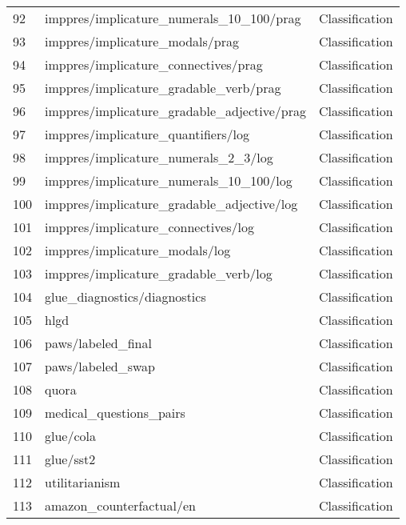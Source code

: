 \documentclass[11pt]{article}
\begin{document}
\begin{longtable}{lll}
92 & imppres/implicature\_numerals\_10\_100/prag \citep{jeretic-etal-2020-natural} & Classification \\
93 & imppres/implicature\_modals/prag \citep{jeretic-etal-2020-natural} & Classification \\
94 & imppres/implicature\_connectives/prag \citep{jeretic-etal-2020-natural} & Classification \\
95 & imppres/implicature\_gradable\_verb/prag \citep{jeretic-etal-2020-natural} & Classification \\
96 & imppres/implicature\_gradable\_adjective/prag \citep{jeretic-etal-2020-natural} & Classification \\
97 & imppres/implicature\_quantifiers/log \citep{jeretic-etal-2020-natural} & Classification \\
98 & imppres/implicature\_numerals\_2\_3/log \citep{jeretic-etal-2020-natural} & Classification \\
99 & imppres/implicature\_numerals\_10\_100/log \citep{jeretic-etal-2020-natural} & Classification \\
100 & imppres/implicature\_gradable\_adjective/log \citep{jeretic-etal-2020-natural} & Classification \\
101 & imppres/implicature\_connectives/log \citep{jeretic-etal-2020-natural} & Classification \\
102 & imppres/implicature\_modals/log \citep{jeretic-etal-2020-natural} & Classification \\
103 & imppres/implicature\_gradable\_verb/log \citep{jeretic-etal-2020-natural} & Classification \\
104 & glue\_diagnostics/diagnostics & Classification \\
105 & hlgd \citep{Laban2021NewsHG} & Classification \\
106 & paws/labeled\_final \citep{paws2019naacl} & Classification \\
107 & paws/labeled\_swap \citep{paws2019naacl} & Classification \\
108 & quora & Classification \\
109 & medical\_questions\_pairs \citep{mccreery2020effective} & Classification \\
110 & glue/cola \citep{N18-1101} & Classification \\
111 & glue/sst2 \citep{N18-1101} & Classification \\
112 & utilitarianism \citep{hendrycks2020ethics} & Classification \\
113 & amazon\_counterfactual/en \citep{oneill2021i} & Classification \\

\end{longtable}
\end{document}
